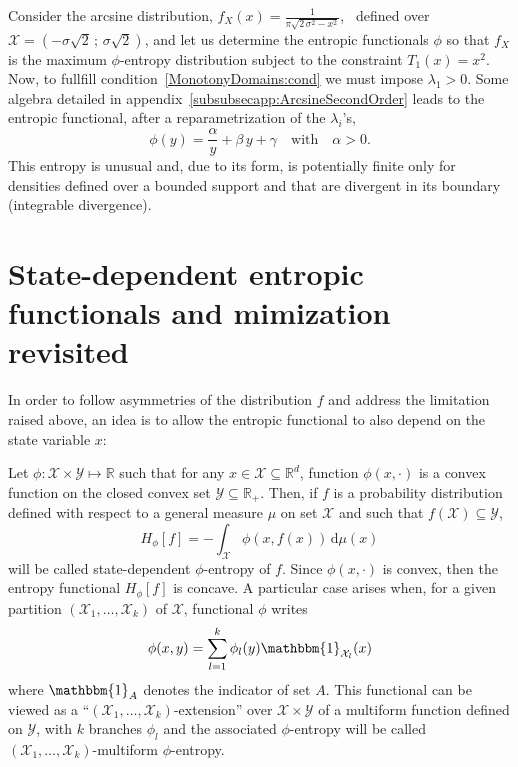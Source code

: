 \documentclass[entropy,article,submit,moreauthors,pdftex]{Definitions/mdpi}
\newcounter{arcsineExample}%
\newcommand{\SZ}[1]{{\color{blue} #1}}                                       %
\def\dmu{\mathrm{d}\mu}%
\def\Rset{\mathbb{R}}%
\def\X{\mathcal{X}}%
\def\Y{\mathcal{Y}}%
\def\un{\mathbbm{1}}%
\begin{document}
%
\begin{Example}\label{arcsine:ex}\setcounter{arcsineExample}{\value{example}}
   Consider the arcsine distribution, $f_X(x) = \frac{1}{\pi \sqrt{2 \, \sigma^2
       - x^2}}$,  \ defined  over $\X  = \left(  -\sigma \sqrt2  \, ;  \, \sigma
   \sqrt2 \right)$, and let us determine the entropic functionals $\phi$ so that
   $f_X$ is  the maximum $\phi$-entropy  distribution subject to  the constraint
   $T_1(x)  = x^2$.   Now, to  fullfill condition~\ref{MonotonyDomains:cond}  we
   must   impose    $\lambda_1   >    0$.    Some   algebra    \SZ{detailed   in
     appendix~\ref{subsubsecapp:ArcsineSecondOrder}}   leads  to   the  entropic
   functional,  after  a reparametrization  of  the  $\lambda_i$'s, $$\phi(y)  =
   \frac{\alpha}{y} + \beta \, y +  \gamma \quad \mbox{with} \quad \alpha > 0.$$
   This entropy is unusual and, due to  its form, is potentially finite only for
   densities  defined over  a  bounded support  and that  are  divergent in  its
   boundary (integrable divergence).
\end{Example}




\section{State-dependent entropic functionals and mimization revisited}
\label{sec:MultiformEnt}

In  order  to  follow  asymmetries  of the  distribution  $f$  and  address  the
limitation raised  above, an idea  is to allow  the entropic functional  to also
depend on the state variable $x$:
%
\begin{Definition}
\label{def:asym_phi-entropy}
%
  Let $\phi: \X \times  \Y \mapsto \Rset$ such that for any  $x \in \X \subseteq
  \Rset^d$, function $\phi(x,\cdot)$  is a convex function on  the closed convex
  set  $\Y \subseteq  \Rset_+$.   Then,  if $f$  is  a probability  distribution
  defined with  respect to  a general measure  $\mu$ on set  $\X$ and  such that
  $f(\X) \subseteq \Y$,
  \begin{equation}\label{eq:asym_phi-entropy}
  H_\phi[f] = - \int_\X \phi(x,f(x)) \, \dmu(x)
  \end{equation}
  will be  called state-dependent $\phi$-entropy of  $f$.  Since $\phi(x,\cdot)$
  is convex, then the entropy functional $H_\phi[f]$ is concave.
  A particular case arises when, for  a given partition $(\X_1 , \ldots , \X_k)$
  of $\X$, functional $\phi$ writes
  \begin{equation}\label{eq:multiform_phi-entropy}
  \phi(x,y) = \sum_{l=1}^k \phi_l(y) \un_{\X_l}(x)
  \end{equation}
  where $\un_A$ denotes the indicator of set $A$.  This functional can be viewed
  as a ``$(\X_1 , \ldots , \X_k)$-extension'' over $\X \times \Y$ of a multiform
  function  defined on  $\Y$,  with  $k$ branches  $\phi_l$  and the  associated
  $\phi$-entropy   will   be  called   $(\X_1   ,   \ldots  ,   \X_k)$-multiform
  $\phi$-entropy.
\end{Definition}
\end{document}
